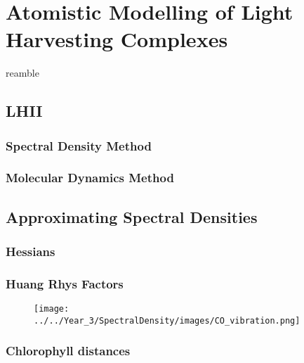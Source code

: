 %
%
\let\textcircled=\pgftextcircled
\chapter{Atomistic Modelling of Light Harvesting Complexes}
\label{chap:LHII}

reamble

\section{LHII}
\label{sec:LHII}


\subsection{Spectral Density Method}
\label{subsec:spec_dens}

\subsection{Molecular Dynamics Method}
\label{subsec:MD}

\section{Approximating Spectral Densities}
\label{sec:monomer_dimer_assign}

\subsection{Hessians}
\label{subsec:hessians}

\subsection{Huang Rhys Factors}
\label{subsec:hrf}

\begin{figure}
    \texttt{[image: ../../Year\_3/SpectralDensity/images/CO\_vibration.png]}
\end{figure}

\subsection{Chlorophyll distances}
\label{subsec:chl_distances}

